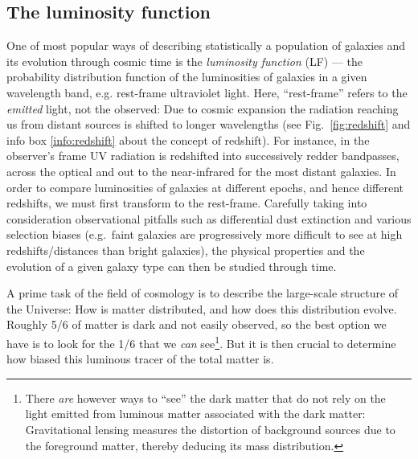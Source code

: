 \documentclass[useAMS]{aa}
\begin{document}
\subsection{The luminosity function}
\label{sec:LF}

One of most popular ways of describing statistically a population of galaxies and its evolution through cosmic time is the \emph{luminosity function} (LF) --- the probability distribution function of the luminosities of galaxies in a given wavelength band, e.g. rest-frame ultraviolet light.
Here, ``rest-frame'' refers to the \emph{emitted} light, not the observed:
Due to cosmic expansion the radiation reaching us from distant sources is shifted to longer wavelengths (see Fig.~\ref{fig:redshift} and info box \ref{info:redshift} about the concept of redshift).
For instance, in the observer's frame UV radiation is redshifted into successively redder bandpasses, across the optical and out to the near-infrared for the most distant galaxies.
In order to compare luminosities of galaxies at different epochs, and hence different redshifts, we must first transform to the rest-frame.
Carefully taking into consideration observational pitfalls such as differential dust extinction and various selection biases (e.g.~faint galaxies are progressively more difficult to see at high redshifts/distances than bright galaxies), the physical properties and the evolution of a given galaxy type can then be studied through time.

A prime task of the field of cosmology is to describe the large-scale structure of the Universe:
How is matter distributed, and how does this distribution evolve.
Roughly 5/6 of matter is dark and not easily observed, so the best option we have is to look for the 1/6 that we \emph{can} see\footnote{There \emph{are} however ways to ``see'' the dark matter that do not rely on the light emitted from luminous matter associated with the dark matter: Gravitational lensing measures the distortion of background sources due to the foreground matter, thereby deducing its mass distribution.}.
But it is then crucial to determine how biased this luminous tracer of the total matter is.
\end{document}
